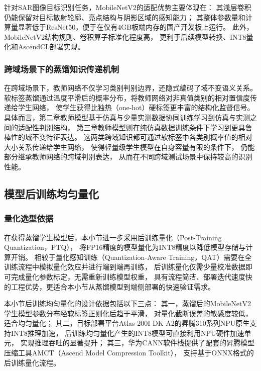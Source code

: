 针对SAR图像目标识别任务，MobileNetV2的适配优势主要体现在：
其浅层卷积仍能保留对目标散射轮廓、亮点结构与阴影区域的感知能力；
其整体参数量和计算量显著低于ResNet50，便于在仅有4GB板端内存的国产开发板上运行。
此外，MobileNetV2结构规则、卷积算子标准化程度高，
更利于后续模型转换、INT8量化和AscendCL部署实现。


\subsubsection{跨域场景下的蒸馏知识传递机制}

在跨域场景下，教师网络不仅学习类别判别边界，还隐式编码了域不变语义关系。
软标签蒸馏通过温度平滑后的概率分布，将教师网络对非真值类别的相对置信度传递给学生网络，
使学生获得比独热（one-hot）硬标签更丰富的结构化监督信号。
具体而言，第二章教师模型基于仿真与少量实测数据协同训练学习到仿真与实测之间的适配性判别结构，
第三章教师模型则在纯仿真数据训练条件下学习到更具鲁棒性的域不变特征表达。
这两类跨域知识都可通过软标签中各类别概率值的相对大小关系传递给学生网络，
使得轻量级学生模型在自身容量有限的条件下，
仍能部分继承教师网络的跨域判别表达，
从而在不同跨域测试场景中保持较高的识别性能。



\subsection{模型后训练均匀量化}

\subsubsection{量化选型依据}

在获得蒸馏学生模型后，本小节进一步采用后训练量化（Post-Training Quantization，PTQ），
将FP16精度的模型量化为INT8精度以降低模型存储与计算开销。
相较于量化感知训练（Quantization-Aware Training，QAT）需要在全训练流程中模拟量化效应并进行端到端再训练，
后训练量化仅需少量校准数据即可完成量化参数标定，无需重新训练模型权重，
具有流程简洁、部署迭代速度快的工程优势，更适合本小节从蒸馏模型到端侧部署的快速验证需求。

本小节后训练均匀量化的设计依据包括以下三点：
其一，蒸馏后的MobileNetV2学生模型参数分布经软标签正则化后趋于平滑，
对量化截断误差的敏感度较低，适合均匀量化；
其二，目标部署平台Atlas 200I DK A2的昇腾310系列NPU原生支持INT8推理加速，
后训练均匀量化产生的INT8模型可直接利用NPU硬件加速单元，
实现推理吞吐的显著提升；
其三，华为CANN软件栈提供了配套的昇腾模型压缩工具AMCT（Ascend Model Compression Toolkit），
支持基于ONNX格式的后训练量化流程。

